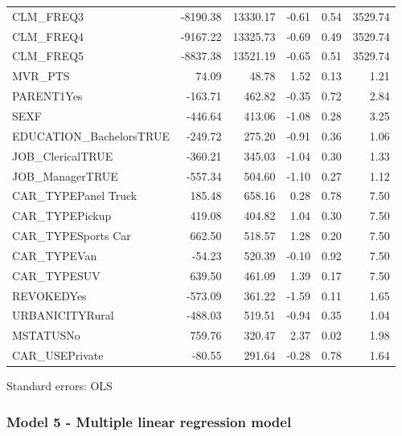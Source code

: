 \documentclass[]{article}
\begin{document}
\begin{table}[!h]
\begin{threeparttable}
\begin{tabular}{lrrrrr}
CLM\_FREQ3 & -8190.38 & 13330.17 & -0.61 & 0.54 & 3529.74\\
\rowcolor{gray!6}  CLM\_FREQ4 & -9167.22 & 13325.73 & -0.69 & 0.49 & 3529.74\\
\addlinespace
CLM\_FREQ5 & -8837.38 & 13521.19 & -0.65 & 0.51 & 3529.74\\
\rowcolor{gray!6}  MVR\_PTS & 74.09 & 48.78 & 1.52 & 0.13 & 1.21\\
PARENT1Yes & -163.71 & 462.82 & -0.35 & 0.72 & 2.84\\
\rowcolor{gray!6}  SEXF & -446.64 & 413.06 & -1.08 & 0.28 & 3.25\\
EDUCATION\_BachelorsTRUE & -249.72 & 275.20 & -0.91 & 0.36 & 1.06\\
\addlinespace
\rowcolor{gray!6}  JOB\_ClericalTRUE & -360.21 & 345.03 & -1.04 & 0.30 & 1.33\\
JOB\_ManagerTRUE & -557.34 & 504.60 & -1.10 & 0.27 & 1.12\\
\rowcolor{gray!6}  CAR\_TYPEPanel Truck & 185.48 & 658.16 & 0.28 & 0.78 & 7.50\\
CAR\_TYPEPickup & 419.08 & 404.82 & 1.04 & 0.30 & 7.50\\
\rowcolor{gray!6}  CAR\_TYPESports Car & 662.50 & 518.57 & 1.28 & 0.20 & 7.50\\
\addlinespace
CAR\_TYPEVan & -54.23 & 520.39 & -0.10 & 0.92 & 7.50\\
\rowcolor{gray!6}  CAR\_TYPESUV & 639.50 & 461.09 & 1.39 & 0.17 & 7.50\\
REVOKEDYes & -573.09 & 361.22 & -1.59 & 0.11 & 1.65\\
\rowcolor{gray!6}  URBANICITYRural & -488.03 & 519.51 & -0.94 & 0.35 & 1.04\\
MSTATUSNo & 759.76 & 320.47 & 2.37 & 0.02 & 1.98\\
\rowcolor{gray!6}  CAR\_USEPrivate & -80.55 & 291.64 & -0.28 & 0.78 & 1.64\\
\bottomrule
\end{tabular}
\begin{tablenotes}
\item Standard errors: OLS
\end{tablenotes}
\end{threeparttable}
\end{table}

\newpage

\subsubsection{Model 5 - Multiple linear regression
model}\label{model-5---multiple-linear-regression-model}
\end{document}
